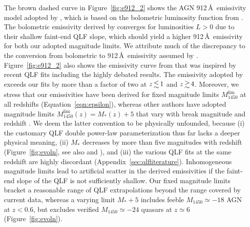 \documentclass[fleqn,usenatbib]{mnras}
\begin{document}
The brown dashed curve in Figure~\ref{fig:e912_2} shows the AGN
912\,\AA\ emissivity model adopted by \citet{2012ApJ...746..125H},
which is based on the bolometric luminosity function from
\citet{2007ApJ...654..731H}.  The bolometric emissivity derived by
\citet{2007ApJ...654..731H} converges for luminosities $L>0$ due to
their shallow faint-end QLF slope, which should yield a higher
912\,\AA\ emissivity for both our adopted magnitude limits. We
attribute much of the discrepancy to the conversion from bolometric to
912\,\AA\ emissivity assumed by \citet{2007ApJ...654..731H}.
Figure~\ref{fig:e912_2} also shows the emissivity curve from
\citet{2015ApJ...813L...8M} that was inspired by recent QLF fits
including the highly debated \citet{2015AA...578A..83G} results.  The
emissivity adopted by \citet{2015ApJ...813L...8M} exceeds our fits by
more than a factor of two at $z\la 1$ and $z\ga 4$. Moreover, we
stress that our emissivities have been derived for fixed magnitude
limits $M_{1450}^\mathrm{lim}$ at all redshifts
(Equation~\eqref{eqn:epsilon}), whereas other authors have adopted
magnitude limits
$M_{1450}^\mathrm{lim}\left(z\right)=M_*\left(z\right)+5$ that vary
with break magnitude and redshift
\citep{2015AA...578A..83G,2015ApJ...813L...8M,2015MNRAS.451L..30K,2018arXiv180104931P}.
We deem the latter convention to be physically unfounded, because (i)
the customary QLF double power-law parameterization thus far lacks a
deeper physical meaning, (ii) $M_*$ decreases by more than five
magnitudes with redshift (Figure~\ref{fig:evoln}, see also
\citealt{2013ApJ...768..105M} and \citealt{2016ApJ...829...33Y}), and
(iii) the various QLF fits at the same redshift are highly discordant
(Appendix~\ref{sec:qlfliterature}).  Inhomogeneous magnitude limits
lead to artificial scatter in the derived emissivities if the
faint-end slope of the QLF is not sufficiently shallow. Our fixed
magnitude limits bracket a reasonable range of QLF extrapolations
beyond the range covered by current data, whereas a varying limit
$M_*+5$ includes feeble $M_{1450}\simeq -18$ AGN at $z<0.6$, but
excludes verified $M_{1450}\simeq -24$ quasars at $z\simeq 6$
(Figure~\ref{fig:evoln}).
\end{document}
